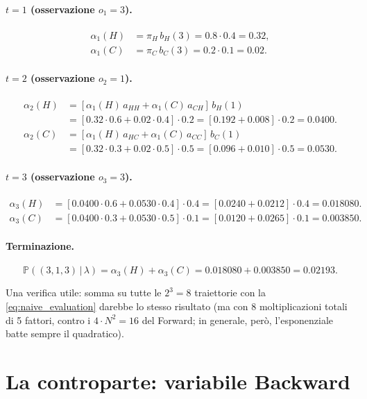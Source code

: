 \documentclass[11pt,a4paper,oneside]{book}
\theoremstyle{plain}
\theoremstyle{definition}
\theoremstyle{remark}
\newcommand{\Prob}{\mathbb{P}}
\newcommand{\hmm}{\lambda}                   %
\newcommand{\Nstates}{N}                     %
\newcommand{\fwd}{\alpha}                    %
\newcommand{\given}{\,\vert\,}
\begin{document}
\paragraph{$t=1$ (osservazione $o_1=3$).}
\begin{align*}
\fwd_1(H) &= \pi_H\,b_H(3) = 0.8\cdot 0.4 = 0.32,\\
\fwd_1(C) &= \pi_C\,b_C(3) = 0.2\cdot 0.1 = 0.02.
\end{align*}

\paragraph{$t=2$ (osservazione $o_2=1$).}
\begin{align*}
\fwd_2(H) &= [\fwd_1(H)\,a_{HH} + \fwd_1(C)\,a_{CH}]\,b_H(1)\\
          &= [0.32\cdot 0.6 + 0.02\cdot 0.4]\cdot 0.2
           = [0.192 + 0.008]\cdot 0.2 = 0.0400.\\
\fwd_2(C) &= [\fwd_1(H)\,a_{HC} + \fwd_1(C)\,a_{CC}]\,b_C(1)\\
          &= [0.32\cdot 0.3 + 0.02\cdot 0.5]\cdot 0.5
           = [0.096 + 0.010]\cdot 0.5 = 0.0530.
\end{align*}

\paragraph{$t=3$ (osservazione $o_3=3$).}
\begin{align*}
\fwd_3(H) &= [0.0400\cdot 0.6 + 0.0530\cdot 0.4]\cdot 0.4
           = [0.0240+0.0212]\cdot 0.4 = 0.018080.\\
\fwd_3(C) &= [0.0400\cdot 0.3 + 0.0530\cdot 0.5]\cdot 0.1
           = [0.0120+0.0265]\cdot 0.1 = 0.003850.
\end{align*}

\paragraph{Terminazione.}
\[
\Prob((3,1,3)\given\hmm) = \fwd_3(H) + \fwd_3(C)
                         = 0.018080 + 0.003850 = 0.02193.
\]

Una verifica utile: somma su tutte le $2^3=8$ traiettorie con la
\eqref{eq:naive_evaluation} darebbe lo stesso risultato (ma con 8
moltiplicazioni totali di 5 fattori, contro i $4\cdot\Nstates^2=16$
del Forward; in generale, però, l'esponenziale batte sempre il
quadratico).

\section{La controparte: variabile Backward}\label{sec:backward}
\end{document}
